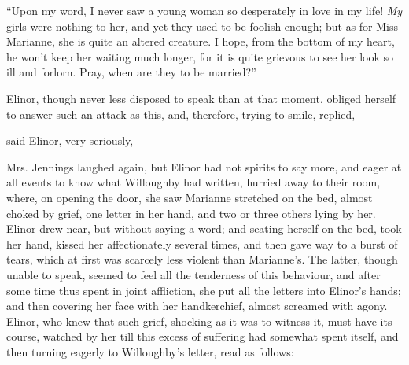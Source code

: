 “Upon my word, I never saw a young woman so desperately in love in my life! {\em My} girls were nothing to her, and yet they used to be foolish enough; but as for Miss Marianne, she is quite an altered creature. I hope, from the bottom of my heart, he won't keep her waiting much longer, for it is quite grievous to see her look so ill and forlorn. Pray, when are they to be married?”

Elinor, though never less disposed to speak than at that moment, obliged herself to answer such an attack as this, and, therefore, trying to smile, replied, 


 said Elinor, very seriously, 

Mrs. Jennings laughed again, but Elinor had not spirits to say more, and eager at all events to know what Willoughby had written, hurried away to their room, where, on opening the door, she saw Marianne stretched on the bed, almost choked by grief, one letter in her hand, and two or three others lying by her. Elinor drew near, but without saying a word; and seating herself on the bed, took her hand, kissed her affectionately several times, and then gave way to a burst of tears, which at first was scarcely less violent than Marianne's. The latter, though unable to speak, seemed to feel all the tenderness of this behaviour, and after some time thus spent in joint affliction, she put all the letters into Elinor's hands; and then covering her face with her handkerchief, almost screamed with agony. Elinor, who knew that such grief, shocking as it was to witness it, must have its course, watched by her till this excess of suffering had somewhat spent itself, and then turning eagerly to Willoughby's letter, read as follows:

